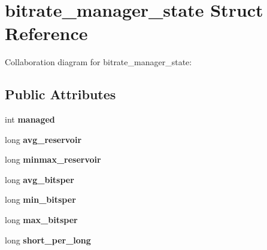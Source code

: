 \hypertarget{structbitrate__manager__state}{\section{bitrate\+\_\+manager\+\_\+state Struct Reference}
\label{structbitrate__manager__state}
}


Collaboration diagram for bitrate\+\_\+manager\+\_\+state\+:
\subsection*{Public Attributes}
\begin{DoxyCompactItemize}
\item 
\hypertarget{structbitrate__manager__state_a874d426e03e2fe791ffaa18772ec73ca}{int {\bfseries managed}}\label{structbitrate__manager__state_a874d426e03e2fe791ffaa18772ec73ca}

\item 
\hypertarget{structbitrate__manager__state_a6fc0ce1557ae9808b2390271008bce0e}{long {\bfseries avg\+\_\+reservoir}}\label{structbitrate__manager__state_a6fc0ce1557ae9808b2390271008bce0e}

\item 
\hypertarget{structbitrate__manager__state_a16a7b9cb7bcc4f9d86efef9fda083fb9}{long {\bfseries minmax\+\_\+reservoir}}\label{structbitrate__manager__state_a16a7b9cb7bcc4f9d86efef9fda083fb9}

\item 
\hypertarget{structbitrate__manager__state_a39abde2acedad23996b933837a0b72be}{long {\bfseries avg\+\_\+bitsper}}\label{structbitrate__manager__state_a39abde2acedad23996b933837a0b72be}

\item 
\hypertarget{structbitrate__manager__state_aa854e0d6bcb60dc3cf27dd5190c70345}{long {\bfseries min\+\_\+bitsper}}\label{structbitrate__manager__state_aa854e0d6bcb60dc3cf27dd5190c70345}

\item 
\hypertarget{structbitrate__manager__state_a48f87c07fd01af4160d38c39d17aa1f2}{long {\bfseries max\+\_\+bitsper}}\label{structbitrate__manager__state_a48f87c07fd01af4160d38c39d17aa1f2}

\item 
\hypertarget{structbitrate__manager__state_a0d147df96a556b32fe5ff84d3d3b8e8f}{long {\bfseries short\+\_\+per\+\_\+long}}\label{structbitrate__manager__state_a0d147df96a556b32fe5ff84d3d3b8e8f}


\end{DoxyCompactItemize}
